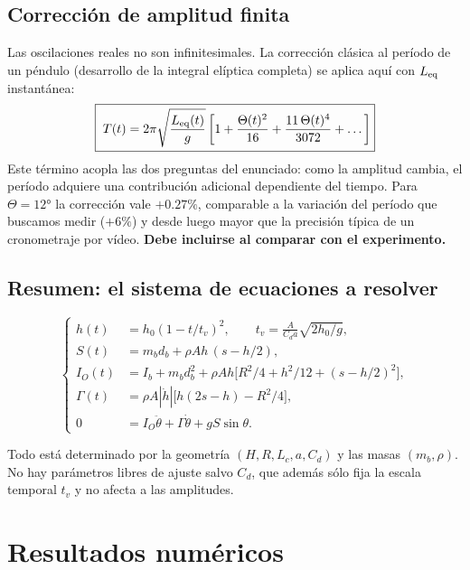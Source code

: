 \documentclass[11pt,a4paper]{article}
\begin{document}
\subsection{Corrección de amplitud finita}

Las oscilaciones reales no son infinitesimales. La corrección clásica al período de un péndulo
(desarrollo de la integral elíptica completa) se aplica aquí con $L_{\rm eq}$ instantánea:
\begin{equation}
\boxed{\;
T(t) = 2\pi\sqrt{\frac{L_{\rm eq}(t)}{g}}
\left[1+\frac{\Theta(t)^2}{16}+\frac{11\,\Theta(t)^4}{3072}+\dots\right]}
\label{eq:Tfinita}
\end{equation}
Este término acopla las dos preguntas del enunciado: como la amplitud cambia, el período adquiere
una contribución adicional dependiente del tiempo. Para $\Theta=\ang{12}$ la corrección vale
$+0.27\%$, comparable a la variación del período que buscamos medir ($+6\%$) y desde luego mayor
que la precisión típica de un cronometraje por vídeo. \textbf{Debe incluirse al comparar con el
experimento.}

\subsection{Resumen: el sistema de ecuaciones a resolver}

\begin{equation}
\left\{
\begin{aligned}
h(t) &= h_0(1-t/t_v)^2, \qquad t_v=\frac{A}{C_d a}\sqrt{2h_0/g},\\[1mm]
S(t) &= m_b d_b + \rho A h\,(s-h/2),\\[1mm]
I_O(t) &= I_b+m_b d_b^2+\rho A h\big[R^2/4+h^2/12+(s-h/2)^2\big],\\[1mm]
\Gamma(t) &= \rho A|\dot h|\big[h(2s-h)-R^2/4\big],\\[1mm]
0 &= I_O\ddot\theta + \Gamma\dot\theta + gS\sin\theta .
\end{aligned}\right.
\label{eq:sistema}
\end{equation}

Todo está determinado por la geometría $(H,R,L_c,a,C_d)$ y las masas $(m_b,\rho)$. No hay
parámetros libres de ajuste salvo $C_d$, que además sólo fija la escala temporal $t_v$ y no afecta
a las amplitudes.

\section{Resultados numéricos}
\label{sec:numerico}
\end{document}
